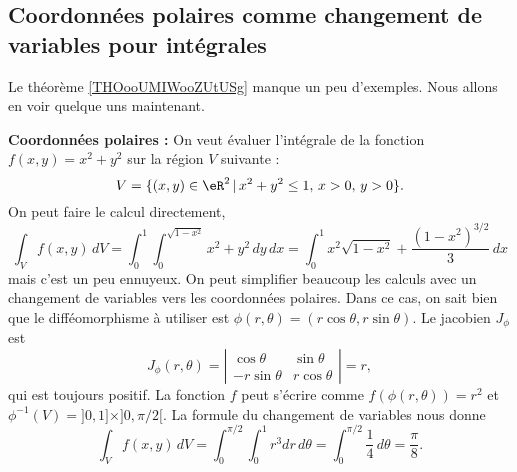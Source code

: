 \subsection{Coordonnées polaires comme changement de variables pour intégrales}
\label{SUBSECooUUAKooMSJHsL}

Le théorème \ref{THOooUMIWooZUtUSg} manque un peu d'exemples. Nous allons en voir quelque uns maintenant.

\begin{example} 
\textbf{Coordonnées polaires : }On veut évaluer l'intégrale de la fonction $f(x,y)= x^2+y^2$ sur la région $V$ suivante :
\[
V=\{(x,y) \in \eR^2\,\vert\, x^2+y^2\leq 1,\, x>0,\, y>0\}.
\]
On peut faire le calcul directement,
\[
\int_{V}f(x,y)\, dV=\int_0^1\int_0^{\sqrt{1-x^2}}x^2+y^2\, dy\,dx=\int_0^1x^2\sqrt{1-x^2} + \frac{(1-x^2)^{3/2}}{3}\, dx  
\] 
mais c'est un peu ennuyeux. On peut simplifier beaucoup les calculs avec un changement de variables vers les coordonnées polaires. Dans ce cas, on sait bien que le difféomorphisme à utiliser est $\phi(r,\theta)=(r\cos \theta, r\sin\theta)$. Le jacobien  $J_{\phi}$ est
\begin{equation}
 J_{\phi}(r, \theta)= \left\vert\begin{array}{cc}
\cos \theta & \sin \theta \\
-r\sin \theta  & r\cos \theta
\end{array}\right\vert= r,
\end{equation}
qui est toujours positif. La fonction $f$ peut s'écrire comme $f(\phi(r,\theta))=r^2$ et $\phi^{-1}(V)=]0,1]\times]0, \pi/2[$.  
La formule du changement de variables nous donne
\[
\int_{V}f(x,y)\, dV=\int_0^{\pi/2}\int_0^{1}r^3 dr\,d\theta=\int_0^{\pi/2}\frac{1}{4}\,d\theta=\frac{\pi}{8}.  
\] 
\end{example}

